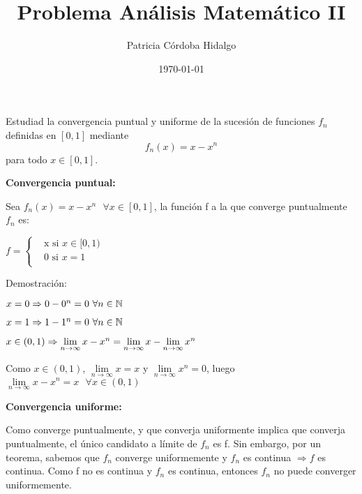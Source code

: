 \documentclass{article}
\begin{document}
\title{Problema Análisis Matemático II}
\author{Patricia Córdoba Hidalgo}
\date{\today}

\maketitle

Estudiad la convergencia puntual y uniforme de la sucesión de funciones $f_n$ definidas en $[0,1]$ mediante $$f_n(x) = x-x^n$$ para todo $x\in [0,1]$.

\textbf{Convergencia puntual:}

Sea $f_n(x) = x - x^n \text{ }\forall x \in [0,1] $, la función f a la que converge puntualmente ${f_n}$ es:

$f=\begin{cases}
 & \text{x si } x \in [0,1) \\
 & \text{0 si } x = 1 \\
\end{cases}$

Demostración:

$x=0 \Rightarrow 0 - 0^n = 0 \text{ }\forall n \in \mathbb{N} \\$

$x=1 \Rightarrow 1 - 1^n = 0 \text{ }\forall n \in \mathbb{N} \\$

$x \in (0,1) \Rightarrow  \lim\limits_{n\to\infty}x - x^n = \lim\limits_{n\to\infty}x - \lim\limits_{n\to\infty}x^n \\$

Como $x \in (0,1)$, $\lim\limits_{n\to\infty}x = x$ \text{   }y $\lim\limits_{n\to\infty}x^n=0$, luego $\lim\limits_{n\to\infty}x - x^n = x  \text{ }\forall x \in (0,1)$

\textbf{Convergencia uniforme:}

Como converge puntualmente, y que converja uniformente implica que converja puntualmente, el único candidato a límite de ${f_n}$ es f. Sin embargo, por un teorema, sabemos que ${f_n}$ converge uniformemente y $f_n$ es continua $\Rightarrow f$ es continua. Como f no es continua y $f_n$ es continua, entonces ${f_n}$ no puede converger uniformemente.
\end{document}
